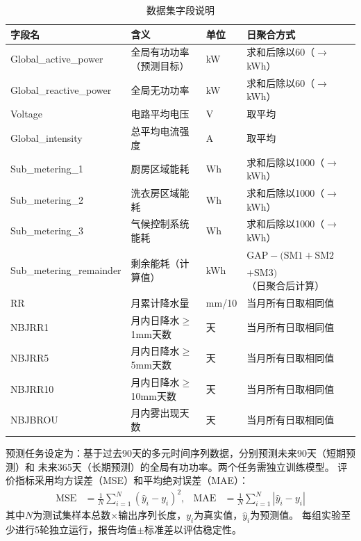 \documentclass[12pt,a4paper]{ctexart}
\begin{document}
\begin{table}[H]
\centering
\caption{数据集字段说明}
\label{tab:fields}
\small
\begin{tabular}{lllp{4.5cm}}
\toprule
\textbf{字段名} & \textbf{含义} & \textbf{单位} & \textbf{日聚合方式} \\
\midrule
Global\_active\_power  & 全局有功功率（预测目标） & kW & 求和后除以60（$\to$ kWh） \\
Global\_reactive\_power & 全局无功功率 & kW & 求和后除以60（$\to$ kWh） \\
Voltage                & 电路平均电压 & V & 取平均 \\
Global\_intensity       & 总平均电流强度 & A & 取平均 \\
Sub\_metering\_1         & 厨房区域能耗 & Wh & 求和后除以1000（$\to$ kWh） \\
Sub\_metering\_2         & 洗衣房区域能耗 & Wh & 求和后除以1000（$\to$ kWh） \\
Sub\_metering\_3         & 气候控制系统能耗 & Wh & 求和后除以1000（$\to$ kWh） \\
\multirow{2}{*}{Sub\_metering\_remainder} & \multirow{2}{*}{剩余能耗（计算值）} & \multirow{2}{*}{kWh} & $\text{GAP} - (\text{SM1} + \text{SM2}$ \\
                       &                      &                       & $+ \text{SM3})$（日聚合后计算） \\
RR                     & 月累计降水量 & mm/10 & 当月所有日取相同值 \\
NBJRR1                 & 月内日降水$\geq$1mm天数 & 天 & 当月所有日取相同值 \\
NBJRR5                 & 月内日降水$\geq$5mm天数 & 天 & 当月所有日取相同值 \\
NBJRR10                & 月内日降水$\geq$10mm天数 & 天 & 当月所有日取相同值 \\
NBJBROU                & 月内雾出现天数 & 天 & 当月所有日取相同值 \\
\bottomrule
\end{tabular}
\end{table}

预测任务设定为：基于过去90天的多元时间序列数据，分别预测未来90天（短期预测）和
未来365天（长期预测）的全局有功功率。两个任务需独立训练模型。
评价指标采用均方误差（MSE）和平均绝对误差（MAE）：
\begin{align}
\text{MSE} &= \frac{1}{N}\sum_{i=1}^{N} (\hat{y}_i - y_i)^2, &
\text{MAE} &= \frac{1}{N}\sum_{i=1}^{N} |\hat{y}_i - y_i|
\end{align}
其中$N$为测试集样本总数$\times$输出序列长度，$y_i$为真实值，$\hat{y}_i$为预测值。
每组实验至少进行5轮独立运行，报告均值$\pm$标准差以评估稳定性。
\end{document}
